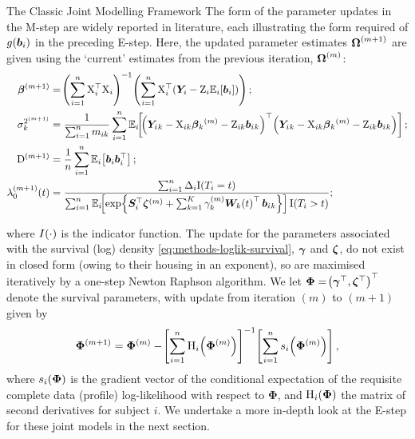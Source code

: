 \begin{chapter}{\label{cha:methods-classic}The Classic Joint Modelling Framework}
  The form of the parameter updates in the M-step are widely reported in literature, each illustrating the form required of $g\!\left(\bm{b}_i\right)$ in the preceding E-step. Here, the updated parameter estimates $\bm{\mathrm{\Omega}}^{(m+1)}$ are given using the `current' estimates from the previous iteration, $\bm{\mathrm{\Omega}}^{(m)}$:
  \begin{equation}
  \begin{aligned}
    \bb^{(m+1)} &= \lb\Si\X_i^\top\X_i\rb^{-1}\lb\Si\X_i^\top\lb\Y-\Z_i \Expi{\b}\rb\rb;\\
    \sigma_k^{2^{(m+1)}} &=\frac{1}{\Si m_{ik}}\Si \Exp_i\!\ls\lb\Y{_k}-\X_{ik}\bb{_k}^{(m)}-\Z_{ik}\b{_k}\rb^\top
                                 \lb\Y{_k}-\X_{ik}\bb{_k}^{(m)}-\Z_{ik}\b{_k}\rb\rs;\\
    \mathrm{D}^{(m+1)} &= \frac{1}{n}\Si \Expi{\b\b^\top};\\
    \lambda^{(m+1)}_0(t) &= \frac{\Si\Delta_i \mathrm{I}(T_i=t)}{\Si \Exp_i\!\ls\exp\lbr\K^\top\bz^{(m)}+\Sk\gamma_k^{(m)}\bm{W}_k\lb t\rb^\top\b{_k}\rbr\rs \mathrm{I}(T_i>t)};
  \end{aligned}
  \label{eq:methods-classicMstep}
  \end{equation}
  
  where $I\!\left(\cdot\right)$ is the indicator function. The update for the parameters associated with the survival (log) density \eqref{eq:methods-loglik-survival}, $\bm{\gamma}$ and $\bm{\zeta}$, do not exist in closed form (owing to their housing in an exponent), so are maximised iteratively by a one-step Newton Raphson algorithm. We let $\bm{\Phi}=\!\left(\bm{\gamma}^\top,\bm{\zeta}^\top\right)^\top$ denote the survival parameters, with update from iteration $(m)$ to $(m+1)$ given by
  \begin{equation}
      \bm{\Phi}^{(m+1)}=\bm{\Phi}^{(m)}-\!\left[\sum_{i=1}^n\mathrm{H}_i\!\left(\bm{\Phi}^{(m)}\right)\right]^{-1}\!\left[\sum_{i=1}^n s_i\!\left(\bm{\Phi}^{(m)}\right)\right],
  \label{eq:methods-survMstep}
  \end{equation}
  where $s_i\!\left(\bm{\Phi}\right)$ is the gradient vector of the conditional expectation of the requisite complete data (profile) log-likelihood with respect to $\bm{\Phi}$, and $\mathrm{H}_i\!\left(\bm{\Phi}\right)$ the matrix of second derivatives for subject $i$.
  We undertake a more in-depth look at the E-step for these joint models in the next section.

\end{chapter}
